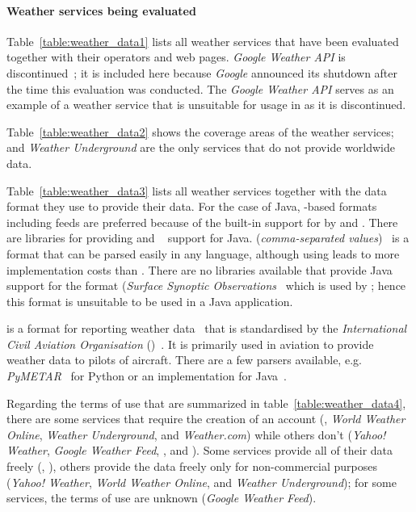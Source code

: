 \paragraph{Weather services being evaluated}

Table~\ref{table:weather_data1} lists all weather services that have been evaluated together with their operators and web pages. \emph{Google Weather API} is discontinued~\cite{google_weather}; it is included here because \emph{Google} announced its shutdown after the time this evaluation was conducted. The \emph{Google Weather API} serves as an example of a weather service that is unsuitable for usage in \thinkhomeweather as it is discontinued.

Table~\ref{table:weather_data2} shows the coverage areas of the weather services;  and \emph{Weather Underground} are the only services that do not provide worldwide data.

Table~\ref{table:weather_data3} lists all weather services together with the data format they use to provide their data. For the case of Java, -based formats including  feeds are preferred because of the built-in support for  by  and . There are libraries for providing  and ~\cite{jsonp} support for Java.  (\emph{comma-separated values})~\cite{rfc4180} is a format that can be parsed easily in any language, although using  leads to more implementation costs than . There are no libraries available that provide Java support for the  format (\emph{Surface Synoptic Observations}~\cite{SYNOP} which is used by ; hence this format is unsuitable to be used in a Java application.

 is a format for reporting weather data~\cite{metar} that is standardised by the \emph{International Civil Aviation Organisation} ()~\cite{ICAO}. It is primarily used in aviation to provide weather data to pilots of aircraft. There are a few parsers available, e.g. \emph{PyMETAR}~\cite{pymetar} for Python or an implementation for Java~\cite{metar-java}.

Regarding the terms of use that are summarized in table~\ref{table:weather_data4}, there are some services that require the creation of an account (, \emph{World Weather Online}, \emph{Weather Underground}, and \emph{Weather.com}) while others don't (\emph{Yahoo! Weather}, \emph{Google Weather Feed}, \yrno, and ). Some services provide all of their data freely (, \yrno), others provide the data freely only for non-commercial purposes (\emph{Yahoo! Weather}, \emph{World Weather Online}, and \emph{Weather Underground}); for some services, the terms of use are unknown (\emph{Google Weather Feed}).

